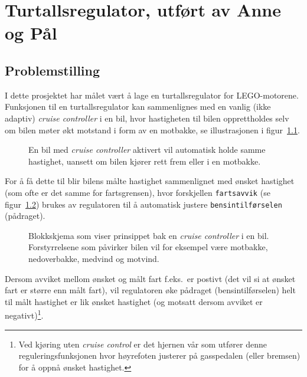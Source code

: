 

\chapter{Turtallsregulator, utført av Anne og Pål}\label{kap:turtall}


\section{Problemstilling}

I dette prosjektet har målet vært å lage en turtallsregulator for
LEGO-motorene. 
Funksjonen til en turtallsregulator kan
sammenlignes med en vanlig (ikke adaptiv)
{\em cruise controller}  i en bil,
hvor hastigheten til bilen opprettholdes selv om bilen møter økt 
motstand i form av en
motbakke, 
se illustrasjonen i
figur~\ref{fig:motbakke}.



\begin{figure}[H]
  \centering
  \caption{En bil med {\em cruise controller} aktivert vil automatisk
    holde samme hastighet, uansett om bilen kjører rett frem eller i en motbakke. } 
  \label{fig:motbakke}
\end{figure}
For å få dette 
til blir bilens målte hastighet sammenlignet med ønsket
hastighet (som ofte er det samme for fartsgrensen), hvor forskjellen
{\tt fartsavvik} (se figur~\ref{fig:neg_feedback}) brukes av regulatoren til å
automatisk justere
{\tt bensintilførselen} (pådraget). 
\begin{figure}[H]
  \centering
  \caption{Blokkskjema som viser prinsippet bak en {\em cruise
      controller} i en bil. Forstyrrelsene som påvirker bilen vil for
    eksempel være
  motbakke, nedoverbakke, medvind og motvind.} 
  \label{fig:neg_feedback}
\end{figure}
Dersom avviket mellom ønsket og målt fart f.eks.\ er postivt (det vil
si at ønsket fart er større enn målt fart), vil regulatoren
øke pådraget (bensintilførselen) helt til målt hastighet er lik ønsket
hastighet (og motsatt dersom avviket er negativt)\footnote{Ved kjøring uten
{\em cruise control} er det hjernen vår som utfører denne 
reguleringsfunksjonen
hvor høyrefoten justerer på gasspedalen (eller bremsen) for å oppnå ønsket hastighet.}.

